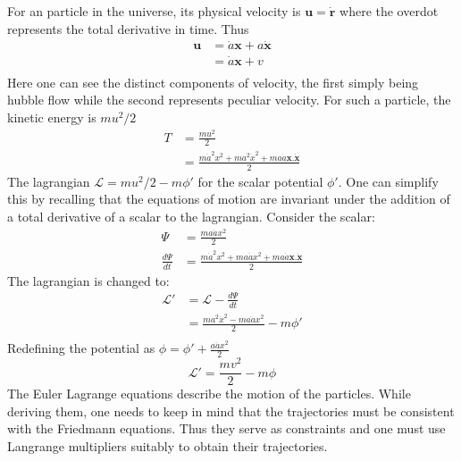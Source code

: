\documentclass[12pt,a4paper,oneside]{book}
\begin{document}
			For an particle in the universe, its physical velocity is $\mathbf{u}=\dot{\mathbf{r}}$ where the overdot represents the total derivative in time. Thus
			$$
			\begin{aligned}
				\mathbf{u} &= \dot{a}\mathbf{x} + a\dot{\mathbf{x}}\\
									&=\dot{a}\mathbf{x} + v\\
			\end{aligned}
			$$
			Here one can see the distinct components of velocity, the first simply being hubble flow while the second represents peculiar velocity.
			For such a particle, the kinetic energy is $mu^2/2$
			$$
			\begin{aligned}
				T&=\frac{mu^2}{2}\\
				  &=\frac{m\dot{a}^2 x^2 + ma^2\dot{x}^2+ma\dot{a}\mathbf{x}.\mathbf{\dot{x}}}{2}
			\end{aligned}
			$$
			The lagrangian $\mathcal{L} = mu^2/2 - m\phi'$ for the scalar potential $\phi'$. One can simplify this by recalling that the equations of motion are invariant under the addition of a total derivative of a scalar to the lagrangian. Consider the scalar:
			$$
			\begin{aligned}
				\Psi &=\frac{ma\dot{a}x^2}{2}\\
				\frac{d\Psi}{dt}&=\frac{m\dot{a}^2 x^2 + ma\ddot{a}x^2+ma\dot{a}\mathbf{x}.\mathbf{\dot{x}}}{2}
			\end{aligned}
			$$
			The lagrangian is changed to:
			$$
			\begin{aligned}
				\mathcal{L}'&=\mathcal{L}-\frac{d\Psi}{dt}\\
									 &=\frac{ma^2\dot{x}^2-ma\ddot{a}x^2}{2}-m\phi'\\
			\end{aligned}
			$$
			Redefining the potential as $\phi = \phi'+\frac{a\ddot{a}x^2}{2}$
			\begin{equation}
				\mathcal{L}'=\frac{mv^2}{2}-m\phi
			\end{equation}
			The Euler Lagrange equations describe the motion of the particles. While deriving them, one needs to keep in mind that the trajectories must be consistent with the Friedmann equations. Thus they serve as constraints and one must use Langrange multipliers suitably to obtain their trajectories.
\end{document}
